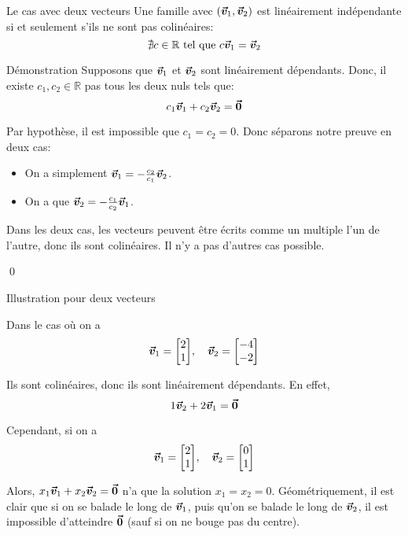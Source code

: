\documentclass{article}
\begin{document}
\begin{parag}{Le cas avec deux vecteurs}
    Une famille avec  $\left(\bvec{v}_1, \bvec{v}_2\right)$ est linéairement indépendante si et seulement s'ils ne sont pas colinéaires: 
    \[\nexists c \in \mathbb{R} \text{ tel que } c \bm{\protect\vec{v}}_1 = \bm{\protect\vec{v}}_2\]
   
    \begin{subparag}{Démonstration}
        Supposons que $\bm{\protect\vec{v}}_1$ et $\bm{\protect\vec{v}}_2$ sont linéairement dépendants. Donc, il existe $c_1, c_2 \in \mathbb{R}$ pas tous les deux nuls tels que: 
        \[c_1 \bm{\protect\vec{v}}_1 + c_2 \bm{\protect\vec{v}}_2 = \bm{\protect\vec{0}}\]

        Par hypothèse, il est impossible que $c_1 = c_2 = 0$. Donc séparons notre preuve en deux cas:
        \begin{itemize}[left=1.5cm]
            \item[\important{$c_1 \neq 0$}] On a simplement $\bm{\protect\vec{v}}_1 = -\frac{c_2}{c_1} \bm{\protect\vec{v}}_2$.
            \item[\important{$c_2 \neq 0$}] On a que $\bm{\protect\vec{v}}_2 = -\frac{c_1}{c_2} \bm{\protect\vec{v}}_1$.
        \end{itemize}

        Dans les deux cas, les vecteurs peuvent être écrits comme un multiple l'un de l'autre, donc ils sont colinéaires. Il n'y a pas d'autres cas possible.

        \qed
    \end{subparag}
\end{parag}

\begin{parag}{Illustration pour deux vecteurs}

    Dans le cas où on a 
    \[\bvec{v}_1 = \begin{bmatrix} 2 \\ 1 \end{bmatrix}, \mathspace \bvec{v}_2 = \begin{bmatrix} -4 \\ -2 \end{bmatrix} \]
    
    Ils sont colinéaires, donc ils sont linéairement dépendants. En effet, 
    \[1 \bm{\protect\vec{v}}_2 + 2\bm{\protect\vec{v}}_1 = \bm{\protect\vec{0}}\]
    
    Cependant, si on a 
    \[\bvec{v}_1 = \begin{bmatrix} 2 \\ 1 \end{bmatrix}, \mathspace \bvec{v}_2 = \begin{bmatrix} 0 \\ 1 \end{bmatrix}\]

    Alors, $x_1 \bm{\protect\vec{v}}_1 + x_2 \bm{\protect\vec{v}}_2 = \bm{\protect\vec{0}}$ n'a que la solution $x_1 = x_2 = 0$. Géométriquement, il est clair que si on se balade le long de $\bm{\protect\vec{v}}_1$, puis qu'on se balade le long de $\bm{\protect\vec{v}}_2$, il est impossible d'atteindre $\bm{\protect\vec{0}}$ (sauf si on ne bouge pas du centre).
\end{parag}
\end{document}
